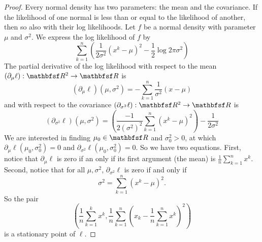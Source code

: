 \begin{proof}Every normal density has two parameters: the mean and the covariance.
If the likelihood of one normal is less than or equal to the likelihood of another, then so also with their log likelihoods.
Let $f$ be a normal density with parameter $\mu $ and $\sigma ^2$.
We express the log likelihood of $f$ by
\[
\sum_{k = 1}^{n} \left( \frac{1}{2\sigma ^2}(x^k - \mu )^2 - \frac{1}{2}\log2\pi \sigma ^2\right)
\]
The partial derivative of the log likelihood with respect to the mean $(\partial_{\mu } \ell ): \R ^2 \to \R $ is
\[
(\partial_\mu  \ell )(\mu , \sigma ^2) = - \sum_{k = 1}^{n} \frac{1}{\sigma ^2}(x - \mu )
\]
and with respect to the covariance $(\partial_{\sigma ^2} \ell ): \R ^2 \to \R $ is
\[
(\partial_{\sigma ^2} \ell )(\mu , \sigma ^2) =
\left(\frac{-1}{2(\sigma ^2)^{2}}\sum_{k = 1}^{n}(x^k - \mu )^2\right)- \frac{1}{2\sigma ^2}
\]
We are interested in finding $\mu _0 \in \R $ and $\sigma ^2_0 > 0$, at which $\partial_\mu  \ell (\mu _0, \sigma ^2_0) = 0$ and $\partial_{\sigma ^2} \ell (\mu _0, \sigma ^2_0) = 0$.
So we have two equations.
First, notice that $\partial_\mu  \ell $ is zero if an only if its first argument (the mean) is $\frac{1}{n} \sum_{k = 1}^{n} x^k$.
Second, notice that for all $\mu , \sigma ^2$, $\partial_{\sigma ^2}\ell $ is zero if and only if
\[
\sigma ^2 = \sum_{k = 1}^{n} (x^k - \mu )^2.
\]
So the pair
\[
\left(\frac{1}{n}\sum_{k = 1}^{k} x^k, \frac{1}{n} \sum_{k = 1}^{n} (x_k - \frac{1}{n} \sum_{k = 1}^{n} x^k)^2\right)
\]
is a stationary point of $\ell $.\end{proof}
